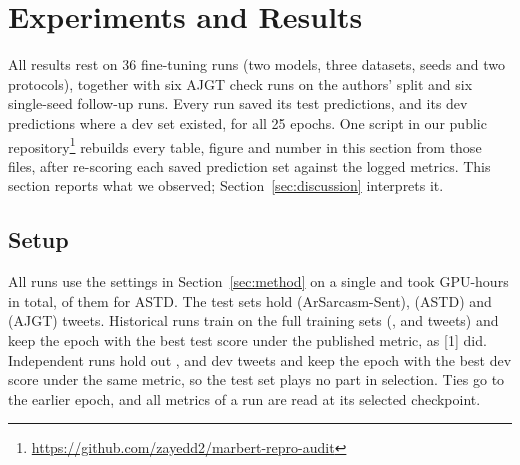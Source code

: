 \providecommand{\gendir}{generated}


\section{Experiments and Results}
\label{sec:results}

All results rest on 36 fine-tuning runs (two models, three datasets, \rsNSeeds{} seeds and two
protocols), together with six AJGT check runs on the authors' split and six single-seed follow-up runs.
Every run saved its test predictions, and its dev predictions where a dev set existed, for all 25 epochs.
One script in our public repository\footnote{\url{https://github.com/zayedd2/marbert-repro-audit}} rebuilds
every table, figure and number in this section from those files, after re-scoring each saved prediction
set against the logged metrics. This section reports what we observed;
Section~\ref{sec:discussion} interprets it.

\subsection{Setup}
\label{sec:results-setup}

All runs use the settings in Section~\ref{sec:method} on a single \rsGPU{} and took \rsGPUHours{} GPU-hours
in total, \rsGPUHoursAstd{} of them for ASTD. The test sets hold \rsNTestArSarc{} (ArSarcasm-Sent),
\rsNTestAstd{} (ASTD) and \rsNTestAjgt{} (AJGT) tweets. Historical runs train on the full training sets
(\rsNTrainHistArSarc{}, \rsNTrainHistAstd{} and \rsNTrainHistAjgt{} tweets) and keep the epoch with the best
test score under the published metric, as [1] did. Independent runs hold out \rsNDevArSarc{},
\rsNDevAstd{} and \rsNDevAjgt{} dev tweets and keep the epoch with the best dev score under the same metric,
so the test set plays no part in selection. Ties go to the earlier epoch, and all metrics of a run are read
at its selected checkpoint.

